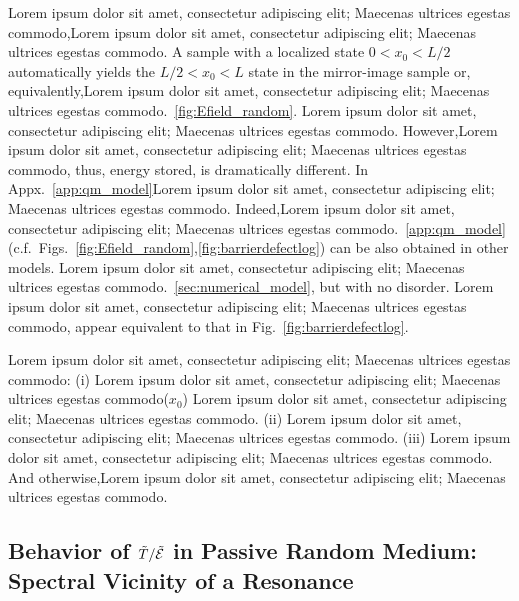 Lorem ipsum dolor sit amet, consectetur adipiscing elit; Maecenas ultrices egestas commodo,Lorem ipsum dolor sit amet, consectetur adipiscing elit; Maecenas ultrices egestas commodo. A sample with a localized state $0<x_0<L/2$ automatically yields the $L/2<x_0<L$ state in the mirror-image sample or, equivalently,Lorem ipsum dolor sit amet, consectetur adipiscing elit; Maecenas ultrices egestas commodo.~\ref{fig:Efield_random}. Lorem ipsum dolor sit amet, consectetur adipiscing elit; Maecenas ultrices egestas commodo. However,Lorem ipsum dolor sit amet, consectetur adipiscing elit; Maecenas ultrices egestas commodo, thus, energy stored, is dramatically different. In Appx.~\ref{app:qm_model}Lorem ipsum dolor sit amet, consectetur adipiscing elit; Maecenas ultrices egestas commodo. Indeed,Lorem ipsum dolor sit amet, consectetur adipiscing elit; Maecenas ultrices egestas commodo.~\ref{app:qm_model} (c.f.~Figs.~\ref{fig:Efield_random},\ref{fig:barrierdefectlog}) can be also obtained in  other models. Lorem ipsum dolor sit amet, consectetur adipiscing elit; Maecenas ultrices egestas commodo.~\ref{sec:numerical_model}, but with no disorder. Lorem ipsum dolor sit amet, consectetur adipiscing elit; Maecenas ultrices egestas commodo, appear equivalent to that in Fig.~\ref{fig:barrierdefectlog}.
 
Lorem ipsum dolor sit amet, consectetur adipiscing elit; Maecenas ultrices egestas commodo: (i) Lorem ipsum dolor sit amet, consectetur adipiscing elit; Maecenas ultrices egestas commodo($x_0$) Lorem ipsum dolor sit amet, consectetur adipiscing elit; Maecenas ultrices egestas commodo. (ii) Lorem ipsum dolor sit amet, consectetur adipiscing elit; Maecenas ultrices egestas commodo. (iii) Lorem ipsum dolor sit amet, consectetur adipiscing elit; Maecenas ultrices egestas commodo. And otherwise,Lorem ipsum dolor sit amet, consectetur adipiscing elit; Maecenas ultrices egestas commodo.

\subsection{Behavior of \texorpdfstring{$\tilde{T}/\tilde{\cal E}$}{T/E} in Passive Random Medium: Spectral Vicinity of a Resonance}
\label{sec:spectral_te}


